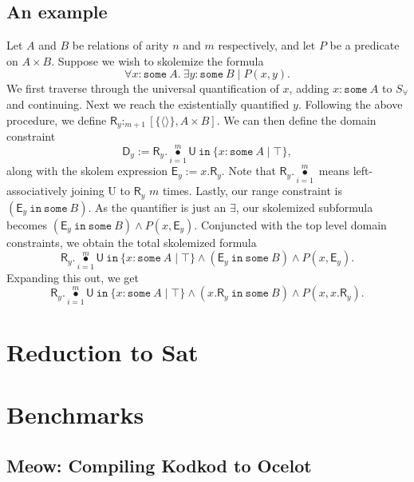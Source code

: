 \documentclass{article}
\theoremstyle{definition}
\DeclareMathOperator{\bigdot}{\bullet}
\begin{document}
    \subsection{An example}
    Let $A$ and $B$ be relations of arity $n$ and $m$ respectively, and let $P$ be a predicate on $A\times B$. Suppose we wish to skolemize the formula
    \[\forall x : \texttt{some}\: A. \: \exists y : \texttt{some}\: B \mid P(x,y).\]
    We first traverse through the universal quantification of $x$, adding $x : \texttt{some}\: A$ to $S_\forall$ and continuing. Next we reach the existentially quantified $y$. Following the above procedure, we define $\textsf{R}_y :_{m + 1} [\{\langle \rangle\}, A\times B]$. We can then define the domain constraint
    \[\textsf{D}_y := \textsf{R}_y .\bigdot\limits_{i = 1}^m \textsf{U}~\texttt{in}~\{x : \texttt{some}\: A \mid \top\},\]
    along with the skolem expression $\textsf{E}_y := x.\textsf{R}_y$. Note that $\textsf{R}_y .\bigdot\limits_{i = 1}^m$ means left-associatively joining \textsf{U} to $\textsf{R}_y$ $m$ times. Lastly, our range constraint is $(\textsf{E}_y~\texttt{in}~\texttt{some}~B)$. As the quantifier is just an $\exists$, our skolemized subformula becomes $(\textsf{E}_y ~ \texttt{in}~\texttt{some}~B) \land P(x, \textsf{E}_y)$. Conjuncted with the top level domain constraints, we obtain the total skolemized formula
    \[\textsf{R}_y .\bigdot\limits_{i = 1}^m \textsf{U}~\texttt{in}~\{x : \texttt{some}\: A \mid \top\} \land (\textsf{E}_y ~ \texttt{in}~\texttt{some}~B) \land P(x, \textsf{E}_y).\]
    Expanding this out, we get
    \[\textsf{R}_y .\bigdot\limits_{i = 1}^m \textsf{U}~\texttt{in}~\{x : \texttt{some}\: A \mid \top\} \land (x.\textsf{R}_y ~ \texttt{in}~\texttt{some}~B) \land P(x, x.\textsf{R}_y).\]

    \section{Reduction to Sat}

    \section{Benchmarks}

    \subsection{Meow: Compiling Kodkod to Ocelot}
\end{document}
